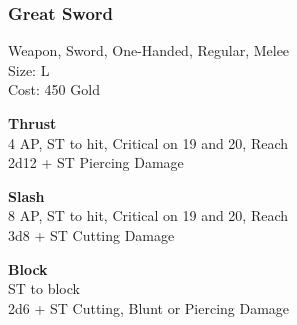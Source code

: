 \subsubsection{Great Sword}\label{weapon:greatSword}
Weapon, Sword, One-Handed, Regular, Melee\\
Size: L\\
Cost: 450 Gold

\textbf{Thrust}\\
4 AP, ST to hit, Critical on 19 and 20,  Reach\\
2d12 + \texttimes ST Piercing Damage

\textbf{Slash}\\
8 AP, ST to hit, Critical on 19 and 20,  Reach\\
3d8 + \texttimes ST Cutting Damage

\textbf{Block}\\
ST to block\\
2d6 + \texttimes ST Cutting, Blunt or Piercing Damage